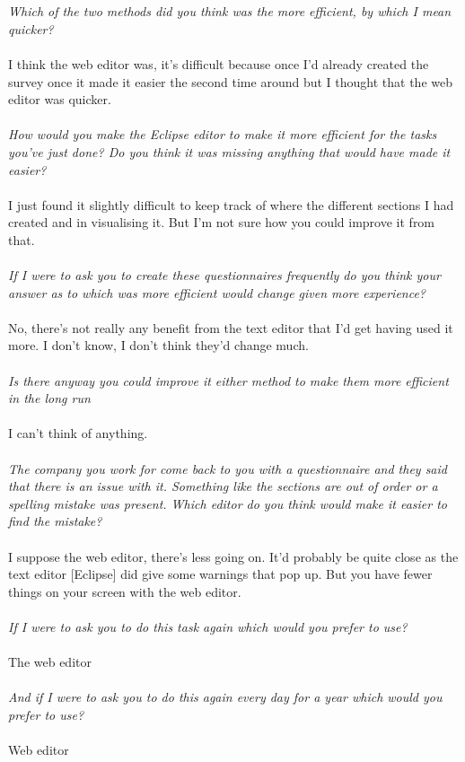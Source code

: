 \documentclass{report}
\begin{document}
\\
\\
\textit{Which of the two methods did you think was the more efficient, by which I mean quicker?}
\\
\\
I think the web editor was, it's difficult because once I'd already created the survey once it made it easier the second time around but I thought that the web editor was quicker.
\\
\\
\textit{How would you make the Eclipse editor to make it more efficient for the tasks you've just done? Do you think it was missing anything that would have made it easier?}
\\
\\
I just found it slightly difficult to keep track of where the different sections I had created and in visualising it. But I'm not sure how you could improve it from that.
\\
\\
\textit{If I were to ask you to create these questionnaires frequently do you think your answer as to which was more efficient would change given more experience?}
\\
\\
No, there's not really any benefit from the text editor that I'd get having used it more. I don't know, I don't think they'd change much.
\\
\\
\textit{Is there anyway you could improve it either method to make them more efficient in the long run}
\\
\\
I can't think of anything.
\\
\\
\textit{The company you work for come back to you with a questionnaire and they said that there is an issue with it. Something like the sections are out of order or a spelling mistake was present. Which editor do you think would make it easier to find the mistake?}
\\
\\
I suppose the web editor, there's less going on. It'd probably be quite close as the text editor [Eclipse] did give some warnings that pop up. But you have fewer things on your screen with the web editor.
\\
\\
\textit{If I were to ask you to do this task again which would you prefer to use?}
\\
\\
The web editor
\\
\\
\textit{And if I were to ask you to do this again every day for a year which would you prefer to use?}
\\
\\
Web editor
\end{document}

